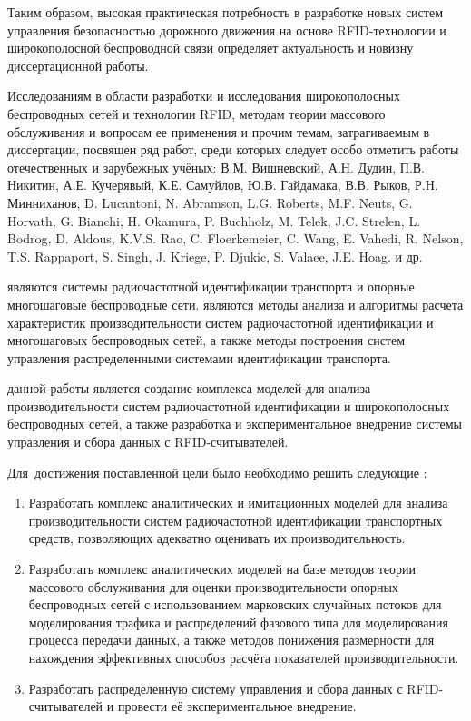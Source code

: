 Таким образом, высокая практическая потребность в разработке новых систем управления безопасностью дорожного движения на основе RFID-технологии и широкополосной беспроводной связи определяет актуальность и новизну диссертационной работы.

Исследованиям в области разработки и исследования широкополосных беспроводных сетей и технологии RFID, методам теории массового обслуживания и вопросам ее применения и прочим темам, затрагиваемым в диссертации, посвящен ряд работ, среди которых следует особо отметить работы отечественных и зарубежных учёных: В.М. Вишневский, А.Н. Дудин, П.В. Никитин, А.Е. Кучерявый, К.Е. Самуйлов, Ю.В. Гайдамака, В.В. Рыков, Р.Н. Минниханов, D. Lucantoni, N. Abramson, L.G. Roberts, M.F. Neuts, G. Horvath, G. Bianchi,  H. Okamura, P. Buchholz, M. Telek, J.C. Strelen, L. Bodrog, D. Aldous, K.V.S. Rao, C. Floerkemeier, C. Wang, E. Vahedi, R. Nelson, T.S. Rappaport, S. Singh, J. Kriege, P. Djukic, S. Valaee, J.E. Hoag. и др.


{\object} являются системы радиочастотной идентификации транспорта и опорные многошаговые беспроводные сети. {\objective} являются методы анализа и алгоритмы расчета характеристик производительности систем радиочастотной идентификации и многошаговых беспроводных сетей, а также методы построения систем управления распределенными системами идентификации транспорта.

{\aim} данной работы является создание комплекса моделей для анализа производительности систем радиочастотной идентификации и широкополосных беспроводных сетей, а также разработка и экспериментальное внедрение системы управления и сбора данных с RFID-считывателей.

Для~достижения поставленной цели было необходимо решить следующие {\tasks}:
\begin{enumerate}[beginpenalty=10000] %
  \item Разработать комплекс аналитических и имитационных моделей для анализа производительности систем радиочастотной идентификации транспортных средств, позволяющих адекватно оценивать их производительность.
  \item Разработать комплекс аналитических моделей на базе методов теории массового обслуживания для оценки производительности опорных беспроводных сетей с использованием марковских случайных потоков для моделирования трафика и распределений фазового типа для моделирования процесса передачи данных, а также методов понижения размерности для нахождения эффективных способов расчёта показателей производительности.
  \item Разработать распределенную систему управления и сбора данных с RFID-считывателей и провести её экспериментальное внедрение.
\end{enumerate}


